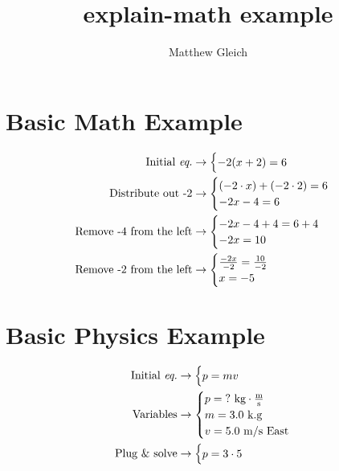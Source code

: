 \documentclass{report}
\title{explain-math example}
\author{Matthew Gleich}
\date{}
\begin{document}
    \maketitle

    \section{Basic Math Example}
        \begin{align*}
            \textrm{Initial \textit{eq.}}&\rightarrow \begin{cases} \displaystyle -2(x + 2) = 6 \end{cases} \\
            \textrm{Distribute out -2}&\rightarrow \begin{cases} 
                (-2 \cdot x) + (-2 \cdot 2) = 6 \\
                -2x - 4 = 6
             \end{cases} \\
            \textrm{Remove -4 from the left}&\rightarrow \begin{cases} 
                -2x - 4 + 4 = 6 + 4 \\
                -2x = 10
             \end{cases} \\
            \textrm{Remove -2 from the left}&\rightarrow \begin{cases} 
                \frac{-2x}{-2} = \frac{10}{-2} \\
                x = -5
             \end{cases} \\
        \end{align*}

    \section{Basic Physics Example}
        \begin{align*}
            \textrm{Initial \textit{eq.}}&\rightarrow \begin{cases} \displaystyle p = mv \end{cases} \\
            \textrm{Variables}&\rightarrow \begin{cases} 
                p = \textrm{?} \textrm{ kg} \cdot \frac{\textrm{m}}{\textrm{s}} \\
                m = 3.0 \textrm{ k.g} \\
                v = 5.0 \textrm{ m/s East}
             \end{cases} \\
            \textrm{Plug \& solve}&\rightarrow \begin{cases} p = 3 \cdot 5 \end{cases} \\
        \end{align*}
\end{document}
